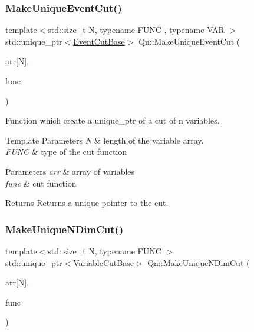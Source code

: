 \subsubsection{\texorpdfstring{Make\+Unique\+Event\+Cut()}{MakeUniqueEventCut()}}
{\footnotesize\ttfamily template$<$std\+::size\+\_\+t N, typename F\+U\+NC , typename V\+AR $>$ \\
std\+::unique\+\_\+ptr$<$\mbox{\hyperlink{structQn_1_1EventCutBase}{Event\+Cut\+Base}}$>$ Qn\+::\+Make\+Unique\+Event\+Cut (\begin{DoxyParamCaption}\item[{V\+AR(\&)}]{arr\mbox{[}\+N\mbox{]},  }\item[{F\+U\+NC \&\&}]{func }\end{DoxyParamCaption})}

Function which create a unique\+\_\+ptr of a cut of n variables. 
\begin{DoxyTemplParams}{Template Parameters}
{\em N} & length of the variable array. \\
\hline
{\em F\+U\+NC} & type of the cut function \\
\hline
\end{DoxyTemplParams}

\begin{DoxyParams}{Parameters}
{\em arr} & array of variables \\
\hline
{\em func} & cut function \\
\hline
\end{DoxyParams}
\begin{DoxyReturn}{Returns}
Returns a unique pointer to the cut. 
\end{DoxyReturn}
\mbox{\label{namespaceQn_ab8bcaebc0a5dd8c6c529aebb582441c3}} 
\subsubsection{\texorpdfstring{Make\+Unique\+N\+Dim\+Cut()}{MakeUniqueNDimCut()}}
{\footnotesize\ttfamily template$<$std\+::size\+\_\+t N, typename F\+U\+NC $>$ \\
std\+::unique\+\_\+ptr$<$\mbox{\hyperlink{structQn_1_1VariableCutBase}{Variable\+Cut\+Base}}$>$ Qn\+::\+Make\+Unique\+N\+Dim\+Cut (\begin{DoxyParamCaption}\item[{\mbox{\hyperlink{classQn_1_1Variable}{Variable}} const (\&)}]{arr\mbox{[}\+N\mbox{]},  }\item[{F\+U\+NC \&\&}]{func }\end{DoxyParamCaption})}

